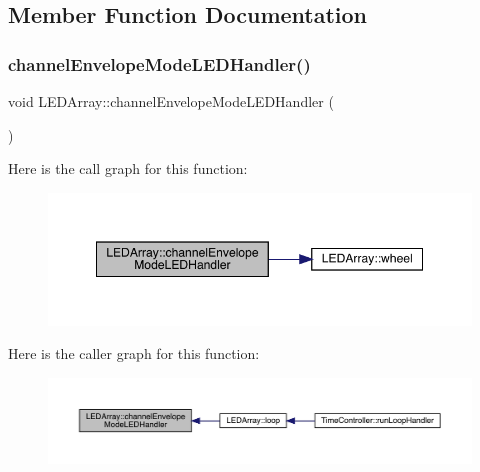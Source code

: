 \subsection{Member Function Documentation}
\mbox{\label{class_l_e_d_array_a4fdfa734a42f2e2f577a0be7ce8953d5}} 
\subsubsection{\texorpdfstring{channel\+Envelope\+Mode\+L\+E\+D\+Handler()}{channelEnvelopeModeLEDHandler()}}
{\footnotesize\ttfamily void L\+E\+D\+Array\+::channel\+Envelope\+Mode\+L\+E\+D\+Handler (\begin{DoxyParamCaption}{ }\end{DoxyParamCaption})}

Here is the call graph for this function\+:
\nopagebreak
\begin{figure}[H]
\begin{center}
\leavevmode
\includegraphics[width=349pt]{class_l_e_d_array_a4fdfa734a42f2e2f577a0be7ce8953d5_cgraph}
\end{center}
\end{figure}
Here is the caller graph for this function\+:
\nopagebreak
\begin{figure}[H]
\begin{center}
\leavevmode
\includegraphics[width=350pt]{class_l_e_d_array_a4fdfa734a42f2e2f577a0be7ce8953d5_icgraph}
\end{center}
\end{figure}
\mbox{\label{class_l_e_d_array_ab90f5a669b0faf8853070e12b99c4b3d}} 
